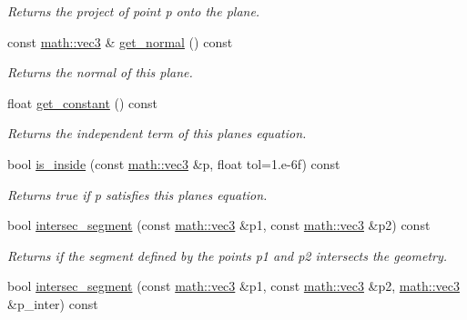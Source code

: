 \begin{DoxyCompactItemize}
\begin{DoxyCompactList}\small\item\em Returns the project of point {\itshape p} onto the plane. \end{DoxyCompactList}\item 
\mbox{\label{classphysim_1_1geometric_1_1plane_a690da5c53e911591de76d487e352049a}} 
const \hyperlink{structphysim_1_1math_1_1vec3}{math\+::vec3} \& \hyperlink{classphysim_1_1geometric_1_1plane_a690da5c53e911591de76d487e352049a}{get\+\_\+normal} () const
\begin{DoxyCompactList}\small\item\em Returns the normal of this plane. \end{DoxyCompactList}\item 
\mbox{\label{classphysim_1_1geometric_1_1plane_afe29f5f29c9e9036884747892f17c071}} 
float \hyperlink{classphysim_1_1geometric_1_1plane_afe29f5f29c9e9036884747892f17c071}{get\+\_\+constant} () const
\begin{DoxyCompactList}\small\item\em Returns the independent term of this plane\textquotesingle{}s equation. \end{DoxyCompactList}\item 
bool \hyperlink{classphysim_1_1geometric_1_1plane_a873ac41caf2d1ed4b9f8e52502ecbd92}{is\+\_\+inside} (const \hyperlink{structphysim_1_1math_1_1vec3}{math\+::vec3} \&p, float tol=1.e-\/6f) const
\begin{DoxyCompactList}\small\item\em Returns true if {\itshape p} satisfies this plane\textquotesingle{}s equation. \end{DoxyCompactList}\item 
bool \hyperlink{classphysim_1_1geometric_1_1plane_a8a3b99b36271702bbececed5fce16391}{intersec\+\_\+segment} (const \hyperlink{structphysim_1_1math_1_1vec3}{math\+::vec3} \&p1, const \hyperlink{structphysim_1_1math_1_1vec3}{math\+::vec3} \&p2) const
\begin{DoxyCompactList}\small\item\em Returns if the segment defined by the points {\itshape p1} and {\itshape p2} intersects the geometry. \end{DoxyCompactList}\item 
bool \hyperlink{classphysim_1_1geometric_1_1plane_a4e42f4d03045655690ee0339a9f2b50d}{intersec\+\_\+segment} (const \hyperlink{structphysim_1_1math_1_1vec3}{math\+::vec3} \&p1, const \hyperlink{structphysim_1_1math_1_1vec3}{math\+::vec3} \&p2, \hyperlink{structphysim_1_1math_1_1vec3}{math\+::vec3} \&p\+\_\+inter) const

\end{DoxyCompactItemize}

